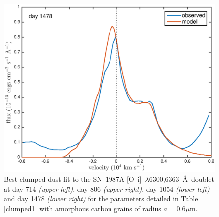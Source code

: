\documentclass[useAMS,usenatbib,usegraphicx]{mnras}
\begin{document}
\begin{figure}
\begin{center}
\includegraphics[trim =33 10 45 15,clip=true,scale=0.41]{clump_1/best_fit/d1478OI}
\caption{Best clumped dust fit to the SN~1987A [O~{\sc i}]~$\lambda$6300,6363~\AA\ doublet at day 714 \textit{(upper left)}, day 806 \textit{(upper right)}, day 1054 \textit{(lower left)} and day 1478 \textit{(lower right)} for the parameters detailed in Table \ref{clumped1} with amorphous carbon grains of radius $a=0.6 \mu$m.}
\label{OI_clump1}
\end{center}
\end{figure}
\end{document}
